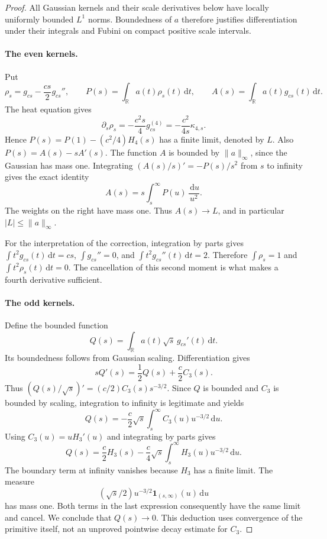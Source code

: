 \documentclass[11pt]{article}
\theoremstyle{remark}\newtheorem{remark}[theorem]{Remark}
\newcommand{\R}{\mathbb R}\newcommand{\C}{\mathbb C}
\newcommand{\dd}{\,\mathrm d}\newcommand{\tr}{\operatorname{tr}}
\newcommand{\one}{\mathbf1}
\begin{document}
\begin{proof}
All Gaussian kernels and their scale derivatives below have locally uniformly bounded $L^1$ norms. Boundedness of $a$ therefore justifies differentiation under their integrals and Fubini on compact positive scale intervals.

\paragraph{The even kernels.}
Put
\[
 \rho_s=g_{cs}-\frac{cs}{2}g_{cs}'',\qquad
 P(s)=\int_\R a(t)\rho_s(t)\dd t,\qquad
 A(s)=\int_\R a(t)g_{cs}(t)\dd t.
\]
The heat equation gives
\[
 \partial_s\rho_s=-\frac{c^2s}{4}g_{cs}^{(4)}
                 =-\frac{c^2}{4s}\kappa_{4,s}.
\]
Hence $P(s)=P(1)-(c^2/4)H_4(s)$ has a finite limit, denoted by $L$. Also $P(s)=A(s)-sA'(s)$. The function $A$ is bounded by $\|a\|_\infty$, since the Gaussian has mass one. Integrating $(A(s)/s)'=-P(s)/s^2$ from $s$ to infinity gives the exact identity
\[
 A(s)=s\int_s^\infty P(u)\,\frac{\dd u}{u^2}.
\]
The weights on the right have mass one. Thus $A(s)\to L$, and in particular $|L|\leq\|a\|_\infty$.

For the interpretation of the correction, integration by parts gives $\int t^2g_{cs}(t)\dd t=cs$, $\int g_{cs}''=0$, and $\int t^2g_{cs}''(t)\dd t=2$. Therefore $\int\rho_s=1$ and $\int t^2\rho_s(t)\dd t=0$. The cancellation of this second moment is what makes a fourth derivative sufficient.

\paragraph{The odd kernels.}
Define the bounded function
\[
 Q(s)=\int_\R a(t)\sqrt s\,g_{cs}'(t)\dd t.
\]
Its boundedness follows from Gaussian scaling. Differentiation gives
\[
 sQ'(s)=\frac12Q(s)+\frac c2C_3(s).
\]
Thus $(Q(s)/\sqrt s)'=(c/2)C_3(s)s^{-3/2}$. Since $Q$ is bounded and $C_3$ is bounded by scaling, integration to infinity is legitimate and yields
\[
 Q(s)=-\frac c2\sqrt s\int_s^\infty C_3(u)u^{-3/2}\dd u.
\]
Using $C_3(u)=uH_3'(u)$ and integrating by parts gives
\[
 Q(s)=\frac c2H_3(s)-\frac c4\sqrt s\int_s^\infty H_3(u)u^{-3/2}\dd u.
\]
The boundary term at infinity vanishes because $H_3$ has a finite limit. The measure
\[
 (\sqrt s/2)u^{-3/2}\one_{(s,\infty)}(u)\dd u
\]
has mass one. Both terms in the last expression consequently have the same limit and cancel. We conclude that $Q(s)\to0$. This deduction uses convergence of the primitive itself, not an unproved pointwise decay estimate for $C_3$.


\end{proof}
\end{document}
